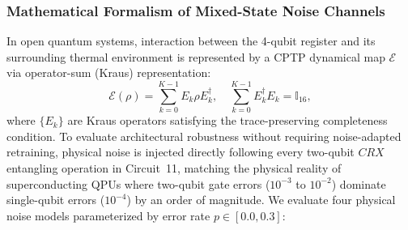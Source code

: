 \documentclass[pdflatex,sn-mathphys-num]{sn-jnl}%
\theoremstyle{thmstyleone}%
\theoremstyle{thmstyletwo}%
\theoremstyle{thmstylethree}%
\begin{document}
\subsubsection{Mathematical Formalism of Mixed-State Noise Channels}
In open quantum systems, interaction between the 4-qubit register and its surrounding thermal environment is represented by a CPTP dynamical map $\mathcal{E}$ via operator-sum (Kraus) representation:
\begin{equation}
\mathcal{E}(\rho) = \sum_{k=0}^{K-1} E_k \rho E_k^\dagger, \quad \sum_{k=0}^{K-1} E_k^\dagger E_k = \mathbb{I}_{16},
\label{eq:cptp_general}
\end{equation}
where $\{E_k\}$ are Kraus operators satisfying the trace-preserving completeness condition. To evaluate architectural robustness without requiring noise-adapted retraining, physical noise is injected directly following every two-qubit $CRX$ entangling operation in Circuit~11, matching the physical reality of superconducting QPUs where two-qubit gate errors ($10^{-3}$ to $10^{-2}$) dominate single-qubit errors ($10^{-4}$) by an order of magnitude. We evaluate four physical noise models parameterized by error rate $p \in [0.0, 0.3]$:
\end{document}
